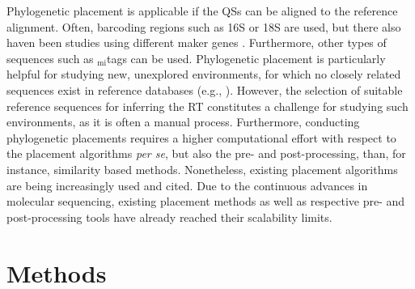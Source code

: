 \documentclass{bioinfo}
\begin{document}
Phylogenetic placement is applicable if the \acp{QS} can be aligned to the reference alignment.
Often, barcoding regions such as 16S or 18S are used,
but there also haven been studies using different maker genes \citep{Sunagawa2013a}.
Furthermore, other types of sequences such as $_{\text{mi}}$tags %
\citep{Logares2014} can be used.
Phylogenetic placement is particularly helpful for studying new, unexplored environments,
for which no closely related sequences exist in reference databases (e.g., \citealp{Mahe2017}).
However, the selection of suitable reference sequences for inferring the \ac{RT} constitutes
a challenge for studying such environments, as it is often a manual process.
Furthermore, conducting phylogenetic placements requires a higher computational effort
with respect to the placement algorithms \emph{per se}, but also the pre- and post-processing,
than, for instance, similarity based methods.
Nonetheless, existing placement algorithms are being increasingly used and cited.
Due to the continuous advances in molecular sequencing, existing placement methods
as well as respective pre- and post-processing tools have already reached their scalability limits.



\section{Methods}
\label{sec:Methods}

\end{document}
